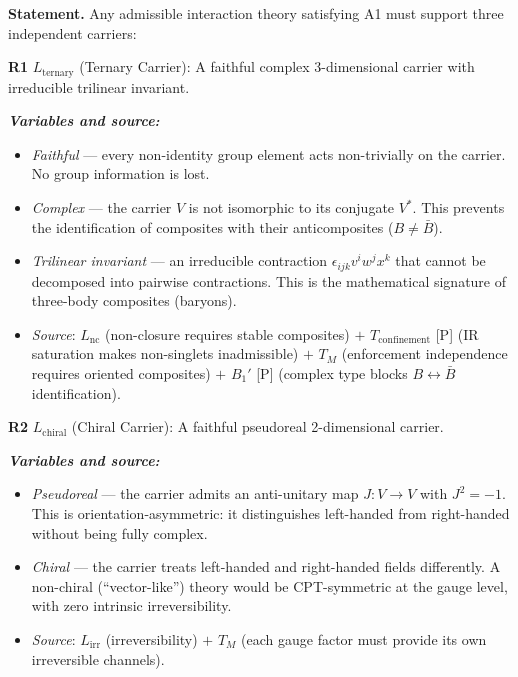\documentclass[11pt]{article}
\newenvironment{varlist}{\begin{itemize}[nosep,leftmargin=2em]}{\end{itemize}}
\begin{document}
\begin{tcolorbox}[apfbox, title={Theorem R: Representation Requirements from Admissibility}]
\textbf{Statement.}  Any admissible interaction theory satisfying A1 must support three independent carriers:

\medskip
\textbf{R1} $L_{\mathrm{ternary}}$ (Ternary Carrier): A faithful complex 3-dimensional carrier with irreducible trilinear invariant.

\smallskip\noindent\textbf{\textit{Variables and source:}}
\begin{varlist}
\item \textit{Faithful} --- every non-identity group element acts non-trivially on the carrier.  No group information is lost.
\item \textit{Complex} --- the carrier $V$ is not isomorphic to its conjugate $V^*$.  This prevents the identification of composites with their anticomposites ($B \ne \bar{B}$).
\item \textit{Trilinear invariant} --- an irreducible contraction $\epsilon_{ijk} v^i w^j x^k$ that cannot be decomposed into pairwise contractions.  This is the mathematical signature of three-body composites (baryons).
\item \textit{Source}: $L_{\mathrm{nc}}$ (non-closure requires stable composites) $+$ $T_{\mathrm{confinement}}$ [P] (IR saturation makes non-singlets inadmissible) $+$ $T_M$ (enforcement independence requires oriented composites) $+$ $B_1'$ [P] (complex type blocks $B \leftrightarrow \bar{B}$ identification).
\end{varlist}

\medskip
\textbf{R2} $L_{\mathrm{chiral}}$ (Chiral Carrier): A faithful pseudoreal 2-dimensional carrier.

\smallskip\noindent\textbf{\textit{Variables and source:}}
\begin{varlist}
\item \textit{Pseudoreal} --- the carrier admits an anti-unitary map $J: V \to V$ with $J^2 = -1$.  This is orientation-asymmetric: it distinguishes left-handed from right-handed without being fully complex.
\item \textit{Chiral} --- the carrier treats left-handed and right-handed fields differently.  A non-chiral (``vector-like'') theory would be CPT-symmetric at the gauge level, with zero intrinsic irreversibility.
\item \textit{Source}: $L_{\mathrm{irr}}$ (irreversibility) $+$ $T_M$ (each gauge factor must provide its own irreversible channels).
\end{varlist}


\end{tcolorbox}
\end{document}
